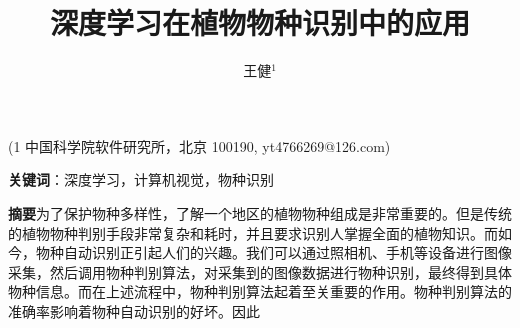 \documentclass[a4paper]{ctexart} %
\title{深度学习在植物物种识别中的应用}
\author{王健$^1$}
\begin{document}
	\maketitle
	\begin{center}
		(1 中国科学院软件研究所，北京 100190, yt4766269@126.com)
	\end{center}
\textbf{关键词}：深度学习，计算机视觉，物种识别

\textbf{摘要}\quad 为了保护物种多样性，了解一个地区的植物物种组成是非常重要的。但是传统的植物物种判别手段非常复杂和耗时，并且要求识别人掌握全面的植物知识。而如今，物种自动识别正引起人们的兴趣。我们可以通过照相机、手机等设备进行图像采集，然后调用物种判别算法，对采集到的图像数据进行物种识别，最终得到具体物种信息。而在上述流程中，物种判别算法起着至关重要的作用。物种判别算法的准确率影响着物种自动识别的好坏。因此
\end{document}
